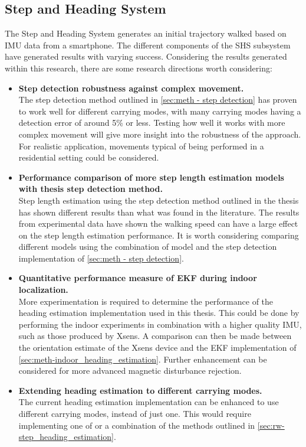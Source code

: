 \subsection{Step and Heading System }

The Step and Heading System generates an initial trajectory walked based on IMU data from a smartphone. The different components of the \ac{SHS} subsystem have generated results with varying success. Considering the results generated within this research, there are some research directions worth considering:

\begin{itemize}
	\item \textbf{Step detection robustness against complex movement.} \\
	The step detection method outlined in \cref{sec:meth - step detection} has proven to work well for different carrying modes, with many carrying modes having a detection error of around 5\% or less. Testing how well it works with more complex movement will give more insight into the robustness of the approach. For realistic application, movements typical of being performed in a residential setting could be considered.
	
	\item \textbf{Performance comparison of more step length estimation models with thesis step detection method.} \\
	Step length estimation using the step detection method outlined in the thesis has shown different results than what was found in the literature. The results from experimental data have shown the walking speed can have a large effect on the step length estimation performance. It is worth considering comparing different models using the combination of model and the step detection implementation of \cref{sec:meth - step detection}. 
	
	\item \textbf{Quantitative performance measure of EKF during indoor localization.}\\
	More experimentation is required to determine the performance of the heading estimation implementation used in this thesis. This could be done by performing the indoor experiments in combination with a higher quality \ac{IMU}, such as those produced by Xsens. A comparison can then be made between the orientation estimate of the Xsens device and the EKF implementation of \cref{sec:meth-indoor_heading_estimation}. Further enhancement can be considered for more advanced magnetic disturbance rejection.
	
	\item \textbf{Extending heading estimation to different carrying modes.}\\
	The current heading estimation implementation can be enhanced to use different carrying modes, instead of just one. This would require implementing one of or a combination of the methods outlined in \cref{sec:rw-step_heading_estimation}.
	
\end{itemize}

